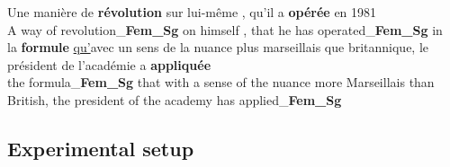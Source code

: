 \begin{exe}
   \ex\label{ex:error_1}
   \gll Une manière de \textbf{révolution} sur lui-même , qu'il a \textbf{opérée} en 1981  \\
   {\fontsize{9}{11}\selectfont A} {\fontsize{9}{11}\selectfont way} {\fontsize{9}{11}\selectfont of} {\fontsize{9}{11}\selectfont revolution\_\textbf{Fem\_Sg}} {\fontsize{9}{11}\selectfont on} {\fontsize{9}{11}\selectfont himself} {\fontsize{9}{11}\selectfont, } {\fontsize{9}{11}\selectfont that he} {\fontsize{9}{11}\selectfont has} {\fontsize{9}{11}\selectfont operated\_\textbf{Fem\_Sg}} {\fontsize{9}{11}\selectfont in} {\fontsize{9}{11}} \\
   \ex\label{ex:error_2}
  \gll la \textbf{formule} \underline{qu’}avec un sens de la nuance plus marseillais que britannique, le président de l’académie a \textbf {appliquée} \\
  {\fontsize{9}{11}\selectfont the } {\fontsize{9}{11}\selectfont formula\_\textbf{Fem\_Sg}} {\fontsize{9}{11}\selectfont that with} {\fontsize{9}{11}\selectfont a} {\fontsize{9}{11}\selectfont sense} {\fontsize{9}{11}\selectfont of} {\fontsize{9}{11}\selectfont the} {\fontsize{9}{11}\selectfont nuance} {\fontsize{9}{11}\selectfont more} {\fontsize{9}{11}\selectfont Marseillais} {\fontsize{9}{11}\selectfont than} {\fontsize{9}{11}\selectfont British,} {\fontsize{9}{11}\selectfont the} {\fontsize{9}{11}\selectfont president} {\fontsize{9}{11}\selectfont of} {\fontsize{9}{11}\selectfont the academy} {\fontsize{9}{11}\selectfont has} {\fontsize{9}{11}\selectfont applied\_\textbf{Fem\_Sg}}\\
\end{exe}



\subsection{Experimental setup}\label{sec:heuristic_exp_setup}

